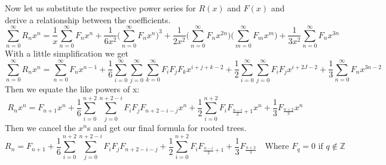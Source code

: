 \documentclass{article}
\begin{document}
 Now let us substitute the respective power series for \(R(x)\) and \(F(x)\) and derive a relationship between the coefficients.
\begin{equation}
\sum_{n=0}^\infty R_nx^n= \frac{1}{x}\sum_{n=0}^\infty F_nx^n +\frac{1}{6x^2}\Big(\sum_{n=0}^\infty F_nx^n \Big)^3+\frac{1}{2x^2}\Big(\sum_{n=0}^\infty F_nx^{2n} \Big)\Big(\sum_{m=0}^\infty F_mx^m \Big) +\frac{1}{3x^2}\sum_{n=0}^\infty F_nx^{3n}
\end{equation}
With a little simplification we get\begin{equation}
\sum_{n=0}^\infty R_nx^n= \sum_{n=0}^\infty F_nx^{n-1} +\frac{1}{6}\sum_{i=0}^\infty \sum_{j=0}^\infty \sum_{k=0}^\infty  F_iF_jF_kx^{i+j+k-2}+\frac{1}{2}\sum_{i=0}^\infty \sum_{j=0}^\infty F_iF_jx^{i+2J-2} +\frac{1}{3}\sum_{n=0}^\infty F_nx^{3n-2}
\end{equation}
Then we equate the like powers of x:
\begin{equation}
 R_nx^n=  F_{n+1}x^n +\frac{1}{6}\sum_{i=0}^{n+2} \sum_{j=0}^{n+2-i} F_iF_jF_{n+2-i-j}x^n+\frac{1}{2}\sum_{i=0}^{n+2}  F_iF_{\frac{n-i}{2}+1}x^n+\frac{1}{3} F_{\frac{n+2}{3}}x^n
\end{equation}
Then we cancel the \(x^n\)s and get our final formula for rooted trees.
\begin{equation}
 R_n=  F_{n+1} +\frac{1}{6}\sum_{i=0}^{n+2} \sum_{j=0}^{n+2-i} F_iF_jF_{n+2-i-j}+\frac{1}{2}\sum_{i=0}^{n+2}  F_iF_{\frac{n-i}{2}+1}+\frac{1}{3} F_{\frac{n+2}{3}} \quad \text{Where } F_q=0 \text{ if } q \notin \mathbb{Z}
\end{equation}
\end{document}
